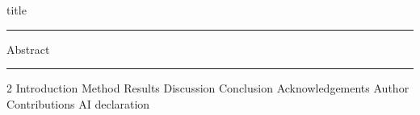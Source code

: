 \documentclass[12pt]{article}
\begin{document}
{title}
\noindent\rule{\linewidth}{0.5pt}
\vspace{-0.1\linewidth}
{Abstract}
\newline
\noindent\rule{\linewidth}{0.5pt}
\begin{multicols}{2}
{Introduction}
{Method}
{Results}
{Discussion}
{Conclusion}
{Acknowledgements}
{Author Contributions}
{AI declaration}





\end{multicols}
\end{document}
